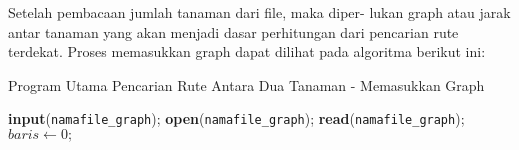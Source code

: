 \documentclass[conference]{IEEEtran}
\begin{document}
    \setlength{\intextsep}{5pt} 
    Setelah  pembacaan  jumlah  tanaman  dari  file,  maka  diper-
    lukan graph atau jarak antar tanaman yang akan menjadi dasar
    perhitungan dari pencarian rute terdekat. Proses memasukkan
    graph dapat dilihat pada algoritma berikut ini:
    \begin{algorithm}
        \SetAlgoLined
        \DontPrintSemicolon
        \caption{Program Utama Pencarian Rute Antara Dua Tanaman - Memasukkan Graph}
        \textbf{input}(\texttt{namafile\_graph});\;
        \textbf{open}(\texttt{namafile\_graph});\;
        \textbf{read}(\texttt{namafile\_graph});\;
        $baris \gets 0;$\;
    \end{algorithm}
\end{document}
